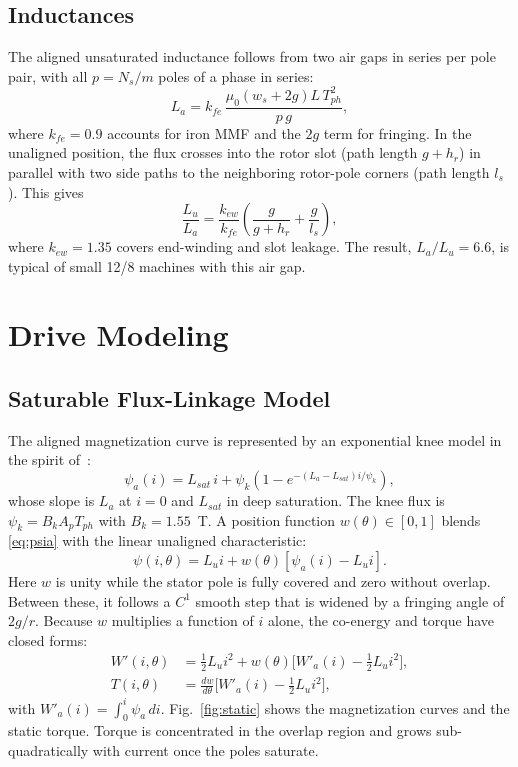 \documentclass[journal]{IEEEtran}
\begin{document}
\subsection{Inductances}
The aligned unsaturated inductance follows from two air gaps in series per pole
pair, with all $p=N_s/m$ poles of a phase in series:
\begin{equation}
L_a = k_{fe}\,\frac{\mu_0 (w_s+2g) L\, T_{ph}^2}{p\,g},
\label{eq:La}
\end{equation}
where $k_{fe}=0.9$ accounts for iron MMF and the $2g$ term for fringing. In
the unaligned position, the flux crosses into the rotor slot (path length $g+h_r$)
in parallel with two side paths to the neighboring rotor-pole corners
(path length $l_s$). This gives
\begin{equation}
\frac{L_u}{L_a} = \frac{k_{ew}}{k_{fe}}\left(\frac{g}{g+h_r}+\frac{g}{l_s}\right),
\label{eq:Lu}
\end{equation}
where $k_{ew}=1.35$ covers end-winding and slot leakage. The result,
$L_a/L_u=6.6$, is typical of small 12/8 machines with this air gap.

\section{Drive Modeling}

\subsection{Saturable Flux-Linkage Model}
The aligned magnetization curve is represented by an exponential knee
model in the spirit of~\cite{torrey1990,ilic1987}:
\begin{equation}
\psi_a(i) = L_{sat}\,i + \psi_k\left(1-e^{-(L_a-L_{sat})i/\psi_k}\right),
\label{eq:psia}
\end{equation}
whose slope is $L_a$ at $i=0$ and $L_{sat}$ in deep saturation. The knee flux is
$\psi_k=B_kA_pT_{ph}$ with $B_k=1.55$~T. A position function
$w(\theta)\in[0,1]$ blends \eqref{eq:psia} with the linear unaligned
characteristic:
\begin{equation}
\psi(i,\theta)=L_u i + w(\theta)\left[\psi_a(i)-L_u i\right].
\label{eq:psi}
\end{equation}
Here $w$ is unity while the stator pole is fully covered and zero without
overlap. Between these, it follows a $C^1$ smooth step that is widened by a
fringing angle of $2g/r$. Because $w$ multiplies a function of $i$ alone, the
co-energy and torque have closed forms:
\begin{align}
W'(i,\theta)&=\tfrac12 L_u i^2 + w(\theta)\big[W'_a(i)-\tfrac12 L_u i^2\big],\\
T(i,\theta)&=\frac{dw}{d\theta}\Big[W'_a(i)-\tfrac12 L_u i^2\Big],
\label{eq:torque}
\end{align}
with $W'_a(i)=\int_0^i\psi_a\,di$. Fig.~\ref{fig:static} shows the
magnetization curves and the static torque. Torque is concentrated in the
overlap region and grows sub-quadratically with current once the poles saturate.
\end{document}
